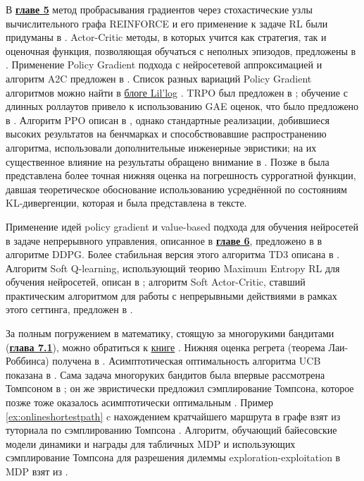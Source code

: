 В \underline{\textbf{главе 5}} метод пробрасывания градиентов через стохастические узлы вычислительного графа REINFORCE и его применение к задаче RL были придуманы в \cite{williams1992simple}. Actor-Critic методы, в которых учится как стратегия, так и оценочная функция, позволяющая обучаться с неполных эпизодов, предложены в \cite{sutton2000policy}. Применение Policy Gradient подхода с нейросетевой аппроксимацией и алгоритм A2C предложен в \cite{mnih2016asynchronous}. Список разных вариаций Policy Gradient алгоритмов можно найти в \href{https://lilianweng.github.io/lil-log/2018/04/08/policy-gradient-algorithms.html}{блоге Lil'log} \cite{weng2018PG}. TRPO был предложен в \cite{schulman2015trust}; обучение с длинных роллаутов привело к использованию GAE оценок, что было предложено в \cite{schulman2015high}. Алгоритм PPO описан в \cite{schulman2017proximal}, однако стандартные реализации, добившиеся высоких результатов на бенчмарках и способствовавшие распространению алгоритма, использовали дополнительные инженерные эвристики; на их существенное влияние на результаты обращено внимание в \cite{engstrom2019implementation}. Позже в \cite{achiam2017constrained} была представлена более точная нижняя оценка на погрешность суррогатной функции, давшая теоретическое обоснование использованию усреднённой по состояниям KL-дивергенции, которая и была представлена в тексте.

Применение идей policy gradient и value-based подхода для обучения нейросетей в задаче непрерывного управления, описанное в \underline{\textbf{главе 6}}, предложено в \cite{lillicrap2015continuous} в алгоритме DDPG. Более стабильная версия этого алгоритма TD3 описана в \cite{fujimoto2018addressing}. Алгоритм Soft Q-learning, использующий теорию Maximum Entropy RL для обучения нейросетей, описан в \cite{haarnoja2017reinforcement}; алгоритм Soft Actor-Critic, ставший практическим алгоритмом для работы с непрерывными действиями в рамках этого сеттинга, предложен в \cite{haarnoja2018soft}. 

За полным погружением в математику, стоящую за многорукими бандитами (\underline{\textbf{глава 7.1}}), можно обратиться к \href{https://tor-lattimore.com/downloads/book/book.pdf}{книге} \cite{lattimore2020bandit}. Нижняя оценка регрета (теорема Лаи-Роббинса) получена в \cite{lai1985asymptotically}. Асимптотическая оптимальность алгоритма UCB показана в \cite{auer2002finite}. Сама задача многоруких бандитов была впервые рассмотрена Томпсоном в \cite{thompson1933likelihood}; он же эвристически предложил сэмплирование Томпсона, которое позже тоже оказалось асимптотически оптимальным \cite{kaufmann2012thompson}. Пример \ref{ex:onlineshortestpath} c нахождением кратчайшего маршрута в графе взят из туториала по сэмплированию Томпсона \cite{russo2017tutorial}. Алгоритм, обучающий байесовские модели динамики и награды для табличных MDP и использующих сэмплирование Томпсона для разрешения дилеммы exploration-exploitation в MDP взят из \cite{osband2013more}.

